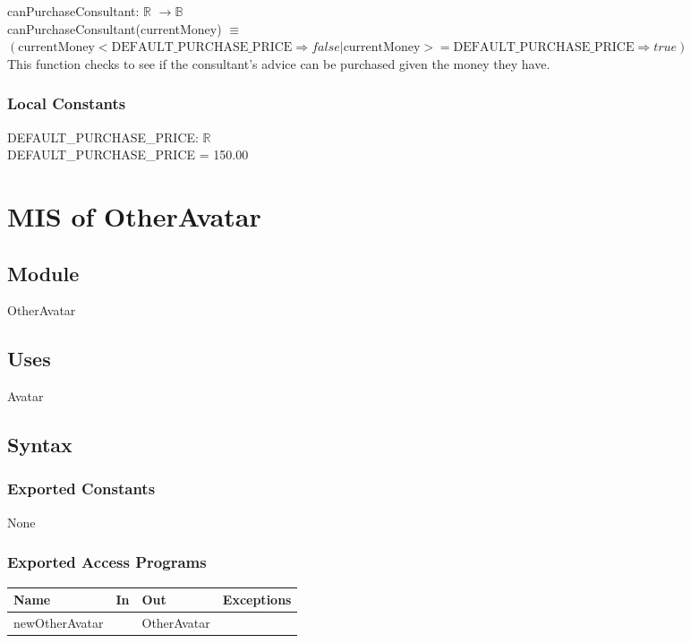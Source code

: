 \documentclass[12pt, titlepage]{article}
\begin{document}
\noindent canPurchaseConsultant: $\mathbb{R}$ $\rightarrow \mathbb{B}$  \\
canPurchaseConsultant(currentMoney) $\equiv$ $(\text{currentMoney} < \text{DEFAULT\_PURCHASE\_PRICE} \Rightarrow false | \text{currentMoney} >= \text{DEFAULT\_PURCHASE\_PRICE} \Rightarrow true) $  \\
This function checks to see if the consultant's advice can be purchased given the money they have.

\subsubsection{Local Constants}

\noindent DEFAULT\_PURCHASE\_PRICE: $\mathbb{R}$\\
DEFAULT\_PURCHASE\_PRICE = 150.00


\newpage

\section{MIS of OtherAvatar} 


\subsection{Module}
OtherAvatar

\subsection{Uses}
Avatar


\subsection{Syntax}

\subsubsection{Exported Constants}
None

\subsubsection{Exported Access Programs}

\begin{center}
\begin{tabular}{p{3cm} p{4cm} p{4cm} p{2cm}}
\hline
\textbf{Name} & \textbf{In} & \textbf{Out} & \textbf{Exceptions} \\
\hline
newOtherAvatar &  & OtherAvatar & \\
\hline

\end{tabular}
\end{center}
\end{document}
